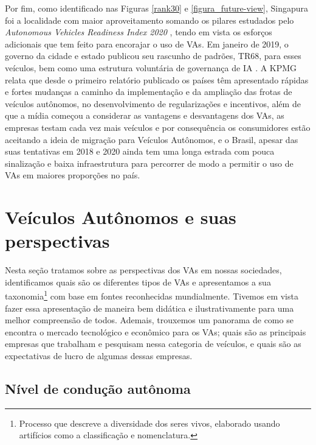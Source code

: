 Por fim, como identificado nas Figuras \ref{rank30} e \ref{figura_future-view}, Singapura foi a localidade com maior aproveitamento somando os pilares estudados pelo \textit{Autonomous Vehicles Readiness Index 2020} \cite{KPMG}, tendo em vista os esforços adicionais que tem feito para encorajar o uso de VAs. Em janeiro de 2019, o governo da cidade e estado publicou seu rascunho de padrões, TR68, para esses veículos, bem como uma estrutura voluntária de governança de IA \cite{KPMG}. A KPMG relata que desde o primeiro relatório publicado os países têm apresentado rápidas e fortes mudanças a caminho da implementação e da ampliação das frotas de veículos autônomos, no desenvolvimento de regularizações e incentivos, além de que a mídia começou a considerar as vantagens e desvantagens dos VAs, as empresas testam cada vez mais veículos e por consequência os consumidores estão aceitando a ideia de migração para Veículos Autônomos, e o Brasil, apesar das suas tentativas em 2018 e 2020 ainda tem uma longa estrada com pouca sinalização e baixa infraestrutura para percorrer de modo a permitir o uso de VAs em maiores proporções no país.

\newpage
\section{Veículos Autônomos e suas perspectivas}

Nesta seção tratamos sobre as perspectivas dos VAs em nossas sociedades, identificamos quais são os diferentes tipos de VAs e apresentamos a sua taxonomia\footnote{Processo que descreve a diversidade dos seres vivos, elaborado usando artifícios como a classificação e nomenclatura.} com base em fontes reconhecidas mundialmente. Tivemos em vista fazer essa apresentação de maneira bem didática e ilustrativamente para uma melhor compreensão de todos. Ademais, trouxemos um panorama de como se encontra o mercado tecnológico e econômico para os VAs; quais são as principais empresas que trabalham e pesquisam nessa categoria de veículos, e quais são as expectativas de lucro de algumas dessas empresas.

\subsection{Nível de condução autônoma}  \label{nv3}
	

